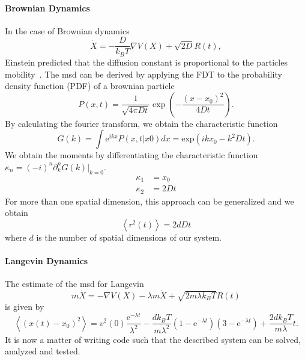 \documentclass[a4paper]{article}
\begin{document}
\paragraph{Brownian Dynamics}
In the case of Brownian dynamics~\cite{Brown1828}
\begin{equation}
    \dot{X} = -\frac{D}{k_B T} \nabla V(X) + \sqrt{2D}R(t),
\end{equation}
Einstein predicted that the diffusion constant is proportional to the particles
mobility~\cite{Einstein1905}.
The \ac{msd} can be derived by applying the FDT to the probability density function (PDF) of a
brownian particle
\begin{equation}
    P(x,t) = \frac{1}{\sqrt{4\pi D t}}\exp\left(-\frac{(x-x_0)^2}{4Dt}\right).
\end{equation}
By calculating the fourier transform, we obtain the characteristic function
\begin{equation}
    G(k) = \int \text{e}^{ikx} P(x,t|x0)dx = \text{exp}(ikx_0 - k^2Dt).
\end{equation}
We obtain the moments by differentiating the characteristic function
$\kappa_n = (-i)^n\partial_k^n G(k)|_{k=0}$.
\begin{align}
    \kappa_1 &= x_0\\
    \kappa_2 &= 2Dt
\end{align}
For more than one spatial dimension, this approach can be generalized and we obtain
\begin{equation}
    \left<r^2(t)\right> = 2d D t
\end{equation}
where $d$ is the number of spatial dimensions of our system.

\paragraph{Langevin Dynamics}
The estimate of the \ac{msd} for Langevin~\cite{Lemons1997}
\begin{equation}
    m \ddot{X} = - \nabla V(X) - \lambda m \dot{X} + \sqrt{2m\lambda k_B T}R(t)
\end{equation}
is given by~\cite{VANKAMPEN2007}
\begin{equation}
    \left<(x(t)-x_0)^2\right> =
        v^2(0) \frac{\text{e}^{-\lambda t}}{\lambda^2}
        - \frac{d k_B T}{m\lambda^2}
            \left(1-\text{e}^{-\lambda t}\right)
            \left(3 - \text{e}^{-\lambda t}\right)
        + \frac{2 d k_B T}{m\lambda}t.
\end{equation}
It is now a matter of writing code such that the described system can be solved, analyzed and
tested.
\end{document}
